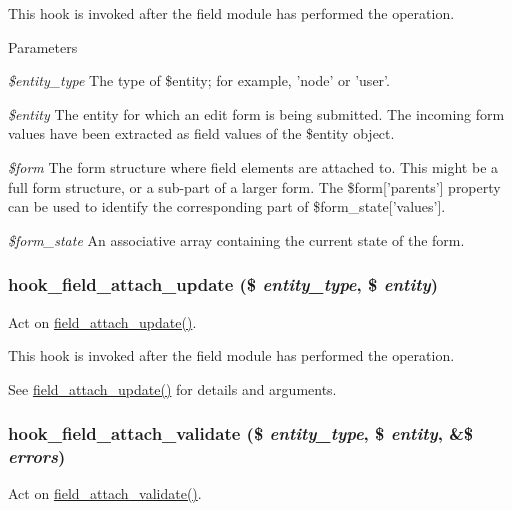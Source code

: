 This hook is invoked after the field module has performed the operation.


\begin{DoxyParams}{Parameters}
\item[{\em \$entity\_\-type}]The type of \$entity; for example, 'node' or 'user'. \item[{\em \$entity}]The entity for which an edit form is being submitted. The incoming form values have been extracted as field values of the \$entity object. \item[{\em \$form}]The form structure where field elements are attached to. This might be a full form structure, or a sub-\/part of a larger form. The \$form\mbox{[}'parents'\mbox{]} property can be used to identify the corresponding part of \$form\_\-state\mbox{[}'values'\mbox{]}. \item[{\em \$form\_\-state}]An associative array containing the current state of the form. \end{DoxyParams}
\hypertarget{group__field__attach_gab8036ab794b9c28993e2414b7829caf1}{
\subsubsection[{hook\_\-field\_\-attach\_\-update}]{\setlength{\rightskip}{0pt plus 5cm}hook\_\-field\_\-attach\_\-update (\$ {\em entity\_\-type}, \/  \$ {\em entity})}}
\label{group__field__attach_gab8036ab794b9c28993e2414b7829caf1}
Act on \hyperlink{group__field__attach_ga8d15efdca36306ea04552bed4986e77b}{field\_\-attach\_\-update()}.

This hook is invoked after the field module has performed the operation.

See \hyperlink{group__field__attach_ga8d15efdca36306ea04552bed4986e77b}{field\_\-attach\_\-update()} for details and arguments. \hypertarget{group__field__attach_ga59269788b50bdcc28d42ad25907db1a5}{
\subsubsection[{hook\_\-field\_\-attach\_\-validate}]{\setlength{\rightskip}{0pt plus 5cm}hook\_\-field\_\-attach\_\-validate (\$ {\em entity\_\-type}, \/  \$ {\em entity}, \/  \&\$ {\em errors})}}
\label{group__field__attach_ga59269788b50bdcc28d42ad25907db1a5}
Act on \hyperlink{group__field__attach_gae56981a9c1006e9c54f695f0ed515cd1}{field\_\-attach\_\-validate()}.

